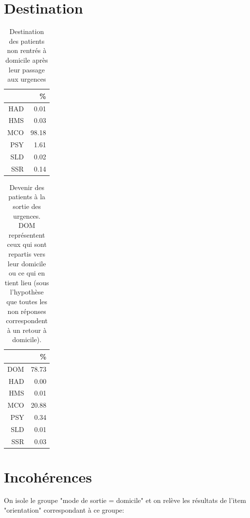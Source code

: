 \documentclass[12pt,english,french,twoside]{book}\usepackage[]{graphicx}\usepackage[]{color}
\begin{document}
\section{Destination}
\begin{table}[ht]
\centering
\begin{tabular}{rr}
  \hline
 & \% \\ 
  \hline
HAD & 0.01 \\ 
  HMS & 0.03 \\ 
  MCO & 98.18 \\ 
  PSY & 1.61 \\ 
  SLD & 0.02 \\ 
  SSR & 0.14 \\ 
   \hline
\end{tabular}
\caption{Destination des patients non rentrés à domicile après leur passage aux urgences} 
\label{tab.dest.hosp}
\end{table}
\begin{table}[ht]
\centering
\begin{tabular}{rr}
  \hline
 & \% \\ 
  \hline
DOM & 78.73 \\ 
  HAD & 0.00 \\ 
  HMS & 0.01 \\ 
  MCO & 20.88 \\ 
  PSY & 0.34 \\ 
  SLD & 0.01 \\ 
  SSR & 0.03 \\ 
   \hline
\end{tabular}
\caption{Devenir des patients à la sortie des urgences. DOM représentent ceux qui sont repartis vers leur domicile ou ce qui en tient lieu (sous l'hypothèse que toutes les non réponses correspondent à un retour à domicile).} 
\label{tab.dest}
\end{table}



\section{Incohérences}


On isole le groupe "mode de sortie = domicile" et on relève les résultats de l'item "orientation" correspondant à ce groupe:
\end{document}

